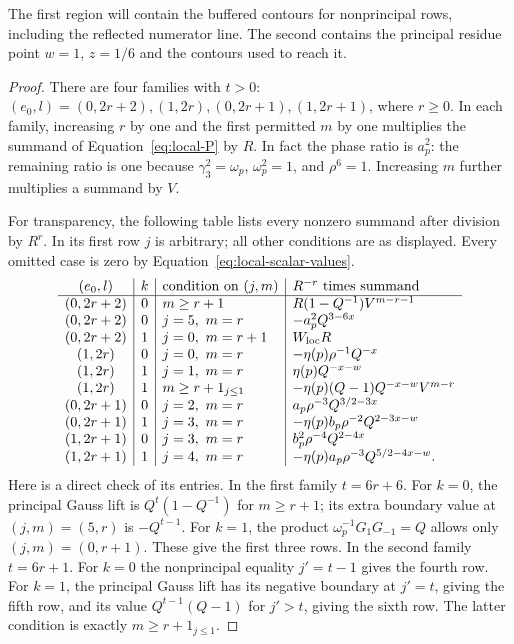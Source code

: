 \documentclass[11pt,a4paper]{article}
\numberwithin{equation}{section}
\numberwithin{figure}{section}
\theoremstyle{definition}
\theoremstyle{remark}
\begin{document}
The first region will contain the buffered contours for nonprincipal
rows, including the reflected numerator line. The second contains the
principal residue point $w=1$, $z=1/6$ and the contours used to reach it.

\begin{proof}
There are four families with $t>0$:
$(e_0,l)=(0,2r+2),(1,2r),(0,2r+1),(1,2r+1)$, where $r\ge0$.
In each family, increasing $r$ by one and the first permitted $m$
by one multiplies the summand of Equation~\eqref{eq:local-P} by
$R$.  In fact the phase ratio is $a_p^2$: the remaining ratio is
one because $\gamma_3^2=\omega_p$, $\omega_p^2=1$, and $\rho^6=1$.
Increasing $m$ further multiplies a summand by $V$.

For transparency, the following table lists every nonzero summand
after division by $R^r$.  In its first row $j$ is arbitrary; all
other conditions are as displayed.  Every omitted case is zero by
Equation~\eqref{eq:local-scalar-values}.
\begin{equation}\label{eq:local-family-table}
\begin{array}{c|c|l|l}
 (e_0,l)&k&\text{condition on }(j,m)&R^{-r}\text{ times summand}\\\hline
 (0,2r+2)&0&m\ge r+1&R(1-Q^{-1})V^{m-r-1}\\
 (0,2r+2)&0&j=5,\ m=r&-a_p^2Q^{3-6x}\\
 (0,2r+2)&1&j=0,\ m=r+1&W_{\rm loc}R\\
 (1,2r)&0&j=0,\ m=r&-\eta(p)\rho^{-1}Q^{-x}\\
 (1,2r)&1&j=1,\ m=r&\eta(p)Q^{-x-w}\\
 (1,2r)&1&m\ge r+1_{j\le1}&-\eta(p)(Q-1)Q^{-x-w}V^{m-r}\\
 (0,2r+1)&0&j=2,\ m=r&a_p\rho^{-3}Q^{3/2-3x}\\
 (0,2r+1)&1&j=3,\ m=r&-\eta(p)b_p\rho^{-2}Q^{2-3x-w}\\
 (1,2r+1)&0&j=3,\ m=r&b_p^2\rho^{-4}Q^{2-4x}\\
 (1,2r+1)&1&j=4,\ m=r&-\eta(p)a_p\rho^{-3}Q^{5/2-4x-w}.
\end{array}
\end{equation}
Here is a direct check of its entries.  In the first family $t=6r+6$.
For $k=0$, the principal Gauss lift is
$Q^t(1-Q^{-1})$ for $m\ge r+1$; its extra boundary value at
$(j,m)=(5,r)$ is $-Q^{t-1}$.  For $k=1$, the product
$\omega_p^{-1}G_1G_{-1}=Q$ allows only $(j,m)=(0,r+1)$.
These give the first three rows.  In the second family $t=6r+1$.
For $k=0$ the nonprincipal equality $j'=t-1$ gives the fourth row.
For $k=1$, the principal Gauss lift has its negative boundary at
$j'=t$, giving the fifth row, and its value $Q^{t-1}(Q-1)$ for
$j'>t$, giving the sixth row.  The latter condition is exactly
$m\ge r+1_{j\le1}$.


\end{proof}
\end{document}

